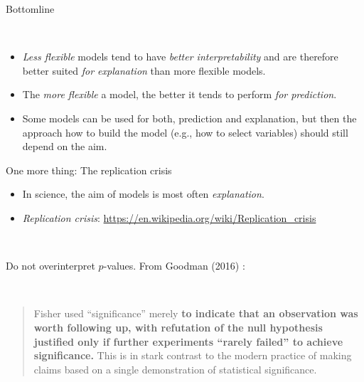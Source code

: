 \documentclass[10pt,ignorenonframetext,]{beamer}
\providecommand{\tightlist}{%
  \setlength{\itemsep}{0pt}\setlength{\parskip}{0pt}}
\begin{document}
\begin{frame}

\begin{block}{Bottomline}

\(~\)

\begin{itemize}
\tightlist
\item
  \emph{Less flexible} models tend to have \emph{better
  interpretability} and are therefore better suited \emph{for
  explanation} than more flexible models.
\end{itemize}

\vspace{2mm}

\begin{itemize}
\tightlist
\item
  The \emph{more flexible} a model, the better it tends to perform
  \emph{for prediction}.
\end{itemize}

\vspace{2mm}

\begin{itemize}
\tightlist
\item
  Some models can be used for both, prediction and explanation, but then
  the approach how to build the model (e.g., how to select variables)
  should still depend on the aim.
\end{itemize}

\end{block}

\end{frame}

\begin{frame}{One more thing: The replication crisis}
\protect\hypertarget{one-more-thing-the-replication-crisis}{}

\vspace{2mm}

\begin{itemize}
\item
  In science, the aim of models is most often \emph{explanation}.
\item
  \emph{Replication crisis}:
  \url{https://en.wikipedia.org/wiki/Replication_crisis}
\end{itemize}

\(~\)

Do not overinterpret \(p\)-values. From Goodman (2016) :

\(~\)

\begin{quote}
Fisher used ``significance'' merely {\bf to indicate that an observation was worth following up, with refutation of the null hypothesis justified only if further experiments ``rarely failed'' to achieve significance.} 
This is in stark contrast to the modern practice of making claims based on a single demonstration of statistical significance.
\end{quote}

\end{frame}
\end{document}
